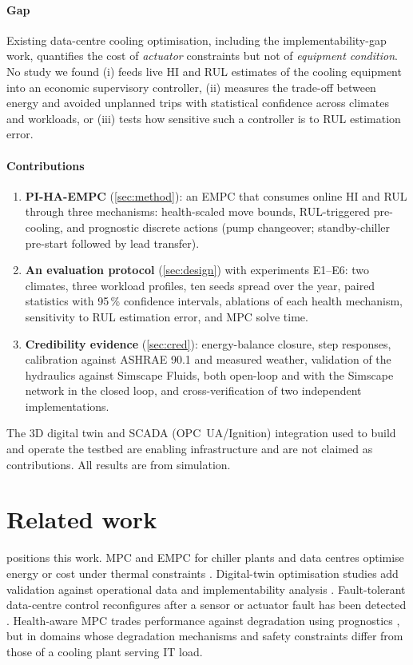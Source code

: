 \documentclass[preprint,12pt,authoryear]{elsarticle}
\begin{document}
\paragraph{Gap} Existing data-centre cooling optimisation, including the implementability-gap work, quantifies the cost of \emph{actuator} constraints but not of \emph{equipment condition}. No study we found (i) feeds live HI and RUL estimates of the cooling equipment into an economic supervisory controller, (ii) measures the trade-off between energy and avoided unplanned trips with statistical confidence across climates and workloads, or (iii) tests how sensitive such a controller is to RUL estimation error.

\paragraph{Contributions}
\begin{enumerate}
\item \textbf{PI-HA-EMPC} (\cref{sec:method}): an EMPC that consumes online HI and RUL through three mechanisms: health-scaled move bounds, RUL-triggered pre-cooling, and prognostic discrete actions (pump changeover; standby-chiller pre-start followed by lead transfer).
\item \textbf{An evaluation protocol} (\cref{sec:design}) with experiments E1--E6: two climates, three workload profiles, ten seeds spread over the year, paired statistics with 95\,\% confidence intervals, ablations of each health mechanism, sensitivity to RUL estimation error, and MPC solve time.
\item \textbf{Credibility evidence} (\cref{sec:cred}): energy-balance closure, step responses, calibration against ASHRAE 90.1 and measured weather, validation of the hydraulics against Simscape Fluids, both open-loop and with the Simscape network in the closed loop, and cross-verification of two independent implementations.
\end{enumerate}
The 3D digital twin and SCADA (OPC~UA/Ignition) integration used to build and operate the testbed are enabling infrastructure and are not claimed as contributions. All results are from simulation.

\section{Related work}\label{sec:related}
 positions this work. MPC and EMPC for chiller plants and data centres optimise energy or cost under thermal constraints \citep{Lazic2018,Fan2023WSE,Satue2025EMPC,Boldocky2026MIDPC,Kim2020RTU}. Digital-twin optimisation studies add validation against operational data and implementability analysis \citep{Jadhav2026DT,Jadhav2026CoDesign,Zhang2026DCVerse}. Fault-tolerant data-centre control reconfigures after a sensor or actuator fault has been detected \citep{Kheradmandi2020FTC}. Health-aware MPC trades performance against degradation using prognostics \citep{Escobet2012HAC,Grosso2016RBEMPC,KarimiPour2018LPV,Sanchez2017HAMPC,Matias2025HAC,Kaki2026EHA}, but in domains whose degradation mechanisms and safety constraints differ from those of a cooling plant serving IT load.
\end{document}
